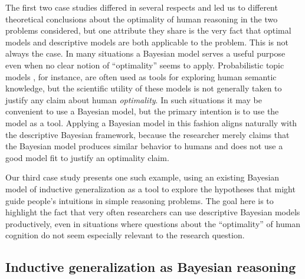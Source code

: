 \documentclass[doc,floatsintext]{apa6}
\begin{document}
The first two case studies differed in several respects and led us to different theoretical conclusions about the optimality of human reasoning in the two problems considered, but one attribute they share is the very fact that optimal models and descriptive models are both applicable to the problem. This is not always the case. In many situations a Bayesian model serves a useful purpose even when no clear notion of ``optimality'' seems to apply. Probabilistic topic models \cite{steyvers_probabilistic_2007}, for instance, are often used as tools for exploring human semantic knowledge, but the scientific utility of these models is not generally taken to justify any claim about human {\it optimality}. In such situations it may be convenient to use a Bayesian model, but the primary intention is to use the model as a tool. Applying a Bayesian model in this fashion aligns naturally with the descriptive Bayesian framework, because the researcher merely claims that the Bayesian model produces similar behavior to humans and does not use a good model fit to justify an optimality claim.

Our third case study presents one such example, using an existing Bayesian model of inductive generalization as a tool to explore the hypotheses that might guide people's intuitions in simple reasoning problems. The goal here is to highlight the fact that very often researchers can use descriptive Bayesian models productively, even in situations where questions about the ``optimality'' of human cognition do not seem especially relevant to the research question.


\subsection{Inductive generalization as Bayesian reasoning}
\end{document}
